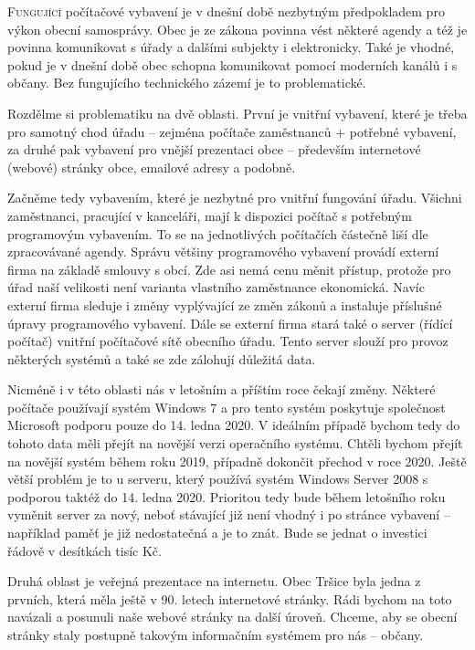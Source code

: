 \documentclass[11pt]{article}
\begin{document}
\begin{multicols}{3}{


\lettrine{F}{ungující} počítačové vybavení je v dnešní době nezbytným předpokladem pro výkon obecní samosprávy. Obec je ze zákona povinna vést některé agendy a též je povinna komunikovat s úřady a dalšími subjekty i elektronicky. Také je vhodné, pokud je v dnešní době obec schopna komunikovat pomocí moderních kanálů i s občany. Bez fungujícího technického zázemí je to problematické.

Rozdělme si problematiku na dvě oblasti. První je vnitřní vybavení, které je třeba pro samotný chod úřadu – zejména počítače zaměstnanců + potřebné vybavení, za druhé pak vybavení pro vnější prezentaci obce – především internetové (webové) stránky obce, emailové adresy a podobně.

Začněme tedy vybavením, které je nezbytné pro vnitřní fungování úřadu. Všichni zaměstnanci, pracující v kanceláři, mají k dispozici počítač s potřebným programovým vybavením. To se na jednotlivých počítačích částečně liší dle zpracovávané agendy. Správu většiny programového vybavení provádí externí firma na základě smlouvy s obcí. Zde asi nemá cenu měnit přístup, protože pro úřad naší velikosti není varianta vlastního zaměstnance ekonomická. Navíc externí firma sleduje i změny vyplývající ze změn zákonů a instaluje příslušné úpravy programového vybavení. Dále se externí firma stará také o server (řídící počítač) vnitřní počítačové sítě obecního úřadu. Tento server slouží pro provoz některých systémů a také se zde zálohují důležitá data.

Nicméně i v této oblasti nás v letošním a příštím roce čekají změny. Některé počítače používají systém Windows 7 a pro tento systém poskytuje společnost Microsoft podporu pouze do 14. ledna 2020. V ideálním případě bychom tedy do tohoto data měli přejít na novější verzi operačního systému. Chtěli bychom přejít na novější systém během roku 2019, případně dokončit přechod v roce 2020. Ještě větší problém je to u serveru, který používá systém Windows Server 2008 s podporou taktéž do 14. ledna 2020. Prioritou tedy bude během letošního roku vyměnit server za nový, neboť stávající již není vhodný i po stránce vybavení – například paměť je již nedostatečná a je to znát. Bude se jednat o investici řádově v desítkách tisíc Kč.

Druhá oblast je veřejná prezentace na internetu. Obec Tršice byla jedna z prvních, která měla ještě v 90. letech internetové stránky. Rádi bychom na toto navázali a posunuli naše webové stránky na další úroveň. Chceme, aby se obecní stránky staly postupně takovým informačním systémem pro nás – občany.

}
\end{multicols}
\end{document}
